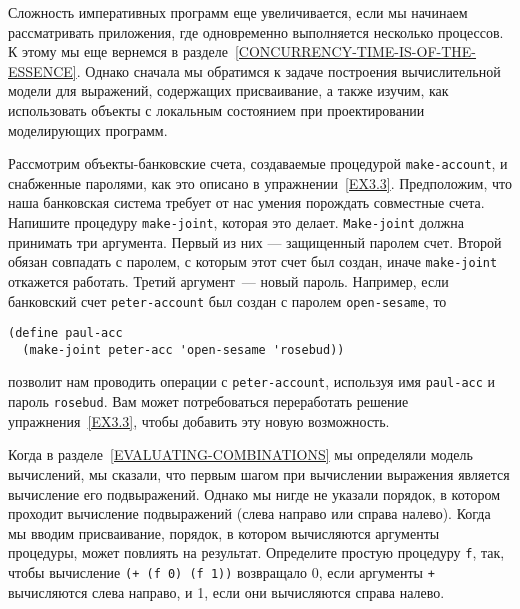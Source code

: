 Сложность императивных программ еще увеличивается,
если мы начинаем рассматривать приложения, где одновременно
выполняется несколько процессов.  К этому мы еще вернемся в
разделе~\ref{CONCURRENCY-TIME-IS-OF-THE-ESSENCE}.  Однако сначала
мы обратимся к задаче построения вычислительной модели для выражений,
содержащих присваивание, а также изучим, как  использовать объекты с
локальным состоянием при проектировании моделирующих программ.
\begin{exercise}{3.7}\label{EX3.7}%
Рассмотрим объекты-банковские счета, создаваемые
процедурой {\tt make-account}, и снабженные паролями, как это
описано в упражнении~\ref{EX3.3}.  Предположим, что наша
банковская система требует от нас умения порождать
 совместные
счета.  Напишите процедуру {\tt make-joint}, которая это
делает. {\tt Make-joint}
должна принимать три аргумента.
Первый из них --- защищенный паролем счет.  Второй обязан совпадать с
паролем, с которым этот счет был создан, иначе {\tt make-joint}
откажется работать.  Третий аргумент~--- новый пароль.  Например, если
банковский счет {\tt peter-account} был создан с паролем
{\tt open-sesame}, то

\begin{Verbatim}[fontsize=\small]
(define paul-acc
  (make-joint peter-acc 'open-sesame 'rosebud))
\end{Verbatim}
позволит нам проводить операции с {\tt peter-account},
используя имя {\tt paul-acc} и пароль {\tt rosebud}.
Вам может потребоваться переработать решение
упражнения~\ref{EX3.3}, чтобы добавить эту новую возможность.
\end{exercise}
\begin{exercise}{3.8}\label{EX3.8}%
Когда в
разделе~\ref{EVALUATING-COMBINATIONS} мы определяли модель
вычислений, мы сказали, что первым шагом при вычислении выражения
является вычисление его подвыражений.  Однако мы нигде не указали
порядок, в котором проходит вычисление подвыражений (слева направо или
справа налево).  Когда мы вводим присваивание, порядок, в котором
вычисляются аргументы процедуры, может повлиять на результат.
Определите простую процедуру {\tt f}, так, чтобы вычисление
{\tt (+ (f 0) (f 1))} возвращало 0, если аргументы
{\tt +} вычисляются слева направо, и 1, если они вычисляются
справа налево.
\end{exercise}

